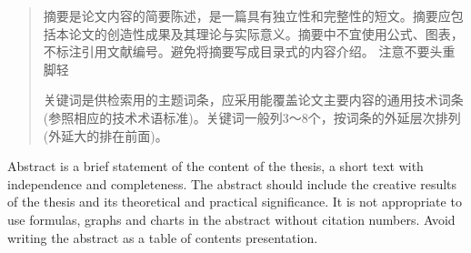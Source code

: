 \begin{abstract}
    摘要是论文内容的简要陈述，是一篇具有独立性和完整性的短文。摘要应包括本论文的创造性成果及其理论与实际意义。摘要中不宜使用公式、图表，不标注引用文献编号。避免将摘要写成目录式的内容介绍。
    注意不要头重脚轻
   
     关键词是供检索用的主题词条，应采用能覆盖论文主要内容的通用技术词条(参照相应的技术术语标准)。关键词一般列3～8个，按词条的外延层次排列(外延大的排在前面)。
   \end{abstract}
   
   
   \begin{enabstract}
    Abstract is a brief statement of the content of the thesis, a short text with independence and completeness. The abstract should include the creative results of the thesis and its theoretical and practical significance. It is not appropriate to use formulas, graphs and charts in the abstract without citation numbers. Avoid writing the abstract as a table of contents presentation.
   
       \enkeywords{}
   \end{enabstract}